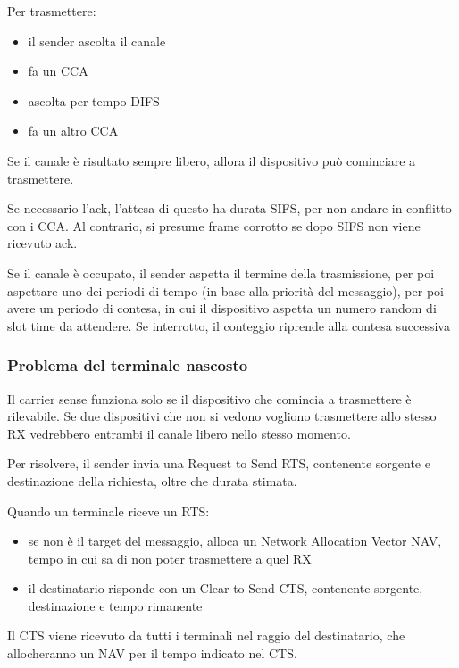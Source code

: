 Per trasmettere: 
\begin{itemize}
    \item il sender ascolta il canale
    
    \item fa un CCA
    
    \item ascolta per tempo DIFS
    
    \item fa un altro CCA
\end{itemize}
Se il canale è risultato sempre libero, allora il dispositivo può cominciare a trasmettere.

Se necessario l'ack, l'attesa di questo ha durata SIFS, per non andare in conflitto con i CCA. Al contrario, si presume frame corrotto se dopo SIFS non viene ricevuto ack.

Se il canale è occupato, il sender aspetta il termine della trasmissione, per poi aspettare uno dei periodi di tempo (in base alla priorità del messaggio), per poi avere un periodo di contesa, in cui il dispositivo aspetta un numero random di slot time da attendere. Se interrotto, il conteggio riprende alla contesa successiva

\subsubsection{Problema del terminale nascosto}

Il carrier sense funziona solo se il dispositivo che comincia a trasmettere è rilevabile. Se due dispositivi che non si vedono vogliono trasmettere allo stesso RX vedrebbero entrambi il canale libero nello stesso momento.

Per risolvere, il sender invia una Request to Send RTS, contenente sorgente e destinazione della richiesta, oltre che durata stimata.

Quando un terminale riceve un RTS:
\begin{itemize}
    \item se non è il target del messaggio, alloca un Network Allocation Vector NAV, tempo in cui sa di non poter trasmettere a quel RX
    
    \item il destinatario risponde con un Clear to Send CTS, contenente sorgente, destinazione e tempo rimanente
\end{itemize}

Il CTS viene ricevuto da tutti i terminali nel raggio del destinatario, che allocheranno un NAV per il tempo indicato nel CTS.

